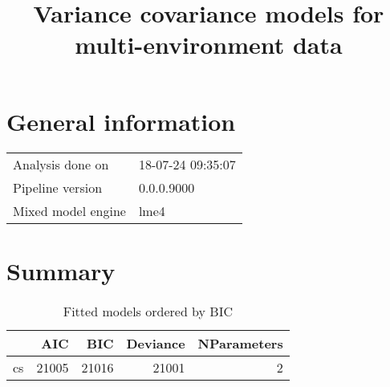 \documentclass[a4paper,11pt]{article}\usepackage[]{graphicx}\usepackage[]{color}
\title{Variance covariance models for multi-environment data}%
\author{\vspace{-5ex}}
\date{\vspace{-5ex}}
\begin{document}
\maketitle
\singlespacing

\section{General information}
\begin{table}[ht]
\begin{flushleft}
\begin{tabular}{ll}
  Analysis done on & 18-07-24 09:35:07 \\ 
  Pipeline version & 0.0.0.9000 \\ 
  Mixed model engine & lme4 \\ 
  \end{tabular}
\label{general}
\end{flushleft}
\end{table}


\section{Summary}
\begin{table}[ht]
\begin{flushleft}
\caption{Fitted models ordered by BIC} 
\label{summary}
\begin{tabular}{lrrrr}
  \hline
 & AIC & BIC & Deviance & NParameters \\ 
  \hline
cs & 21005 & 21016 & 21001 & 2 \\ 
   \hline
\end{tabular}
\end{flushleft}
\end{table}

\clearpage
\end{document}

